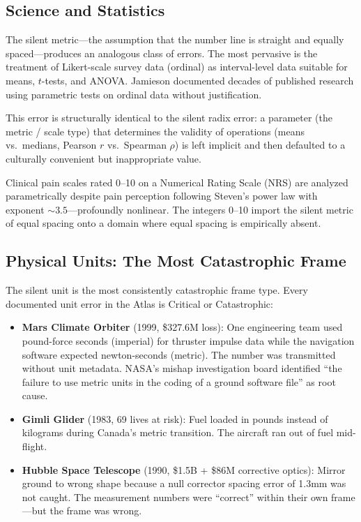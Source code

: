 \documentclass[12pt,a4paper]{article}
\theoremstyle{definition}
\theoremstyle{remark}
\begin{document}
\subsection{Science and Statistics}

The silent metric---the assumption that the number line is straight and equally spaced---produces an analogous class of errors. The most pervasive is the treatment of Likert-scale survey data (ordinal) as interval-level data suitable for means, $t$-tests, and ANOVA. Jamieson \cite{jamieson2004} documented decades of published research using parametric tests on ordinal data without justification.

This error is structurally identical to the silent radix error: a parameter (the metric / scale type) that determines the validity of operations (means vs.\ medians, Pearson $r$ vs.\ Spearman $\rho$) is left implicit and then defaulted to a culturally convenient but inappropriate value.

Clinical pain scales rated 0--10 on a Numerical Rating Scale (NRS) are analyzed parametrically despite pain perception following Steven's power law with exponent $\sim\!3.5$---profoundly nonlinear. The integers 0--10 import the silent metric of equal spacing onto a domain where equal spacing is empirically absent.

\subsection{Physical Units: The Most Catastrophic Frame}

The silent unit is the most consistently catastrophic frame type. Every documented unit error in the Atlas is Critical or Catastrophic:

\begin{itemize}[nosep]
    \item \textbf{Mars Climate Orbiter} (1999, \$327.6M loss): One engineering team used pound-force seconds (imperial) for thruster impulse data while the navigation software expected newton-seconds (metric). The number was transmitted without unit metadata. NASA's mishap investigation board identified ``the failure to use metric units in the coding of a ground software file'' as root cause.
    \item \textbf{Gimli Glider} (1983, 69 lives at risk): Fuel loaded in pounds instead of kilograms during Canada's metric transition. The aircraft ran out of fuel mid-flight.
    \item \textbf{Hubble Space Telescope} (1990, \$1.5B + \$86M corrective optics): Mirror ground to wrong shape because a null corrector spacing error of 1.3mm was not caught. The measurement numbers were ``correct'' within their own frame---but the frame was wrong.
\end{itemize}
\end{document}
